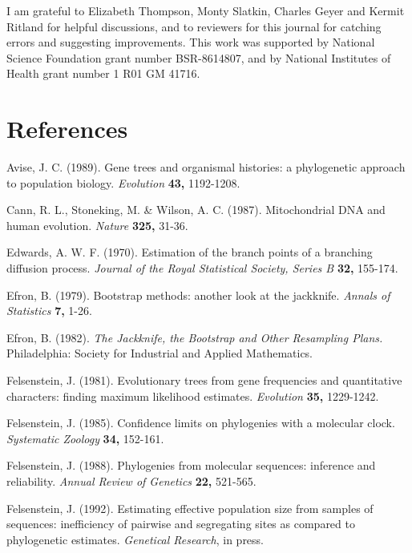 \bigskip

I am grateful to Elizabeth Thompson, Monty Slatkin, Charles Geyer and Kermit
Ritland for
helpful discussions, and to reviewers for this journal for catching errors
and suggesting improvements.  This work was supported by National Science
Foundation
grant number BSR-8614807, and by National Institutes of Health grant number
1 R01 GM 41716.

\bigskip

\section*{References}

{\parindent=-0.2in

\indent

Avise, J. C. (1989).  Gene trees and organismal histories: a phylogenetic
approach to population biology.  {\it Evolution}  {\bf 43,} 1192-1208.
\medskip

Cann, R. L., Stoneking, M. \& Wilson, A. C.  (1987).  Mitochondrial DNA and
human evolution.  {\it Nature}  {\bf 325,} 31-36.
\medskip

Edwards, A. W. F.  (1970).  Estimation of the branch points of a branching
diffusion process. {\it Journal of the Royal Statistical Society, Series B}
{\bf 32,} 155-174.
\medskip

Efron, B. (1979).  Bootstrap methods: another look at the jackknife.  {\it
Annals of Statistics}  {\bf  7,} 1-26.
\medskip

Efron, B. (1982).  {\it The Jackknife, the Bootstrap and Other Resampling Plans.}
Philadelphia: Society for Industrial and Applied Mathematics.
\medskip

Felsenstein, J. (1981).  Evolutionary trees from gene frequencies and
quantitative characters: finding maximum likelihood estimates.  {\it Evolution}
{\bf 35,} 1229-1242.
\medskip

Felsenstein, J. (1985).  Confidence limits on phylogenies with a molecular
clock.  {\it Systematic Zoology} {\bf 34,} 152-161.
\medskip

Felsenstein, J. (1988).   Phylogenies from molecular sequences: inference and
reliability.  {\it Annual Review of Genetics} {\bf 22,} 521-565.
\medskip

Felsenstein, J. (1992).  Estimating effective population size from samples
of sequences: inefficiency of pairwise and segregating sites as compared to
phylogenetic estimates.  {\it Genetical Research}, in press.
\medskip

}

